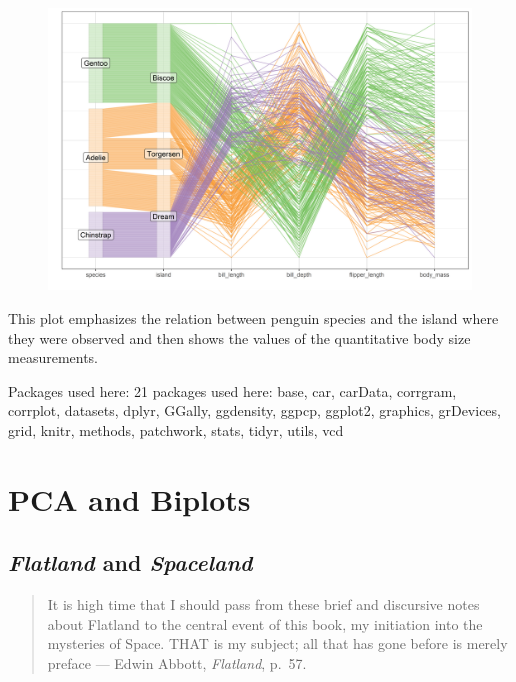 \documentclass[
  letterpaper,
  10pt,
  krantz2]{krantz}
\begin{document}
\begin{figure}

{\centering \includegraphics[width=18in,height=\textheight]{figs/fig-peng-ggpcp2-1.png}

}

\end{figure}

This plot emphasizes the relation between penguin species and the island
where they were observed and then shows the values of the quantitative
body size measurements.

Packages used here: 21 packages used here: base, car, carData, corrgram,
corrplot, datasets, dplyr, GGally, ggdensity, ggpcp, ggplot2, graphics,
grDevices, grid, knitr, methods, patchwork, stats, tidyr, utils, vcd


\hypertarget{sec-pca-biplot}{%
\chapter{PCA and Biplots}\label{sec-pca-biplot}}

\hypertarget{sec-spaceland}{%
\section{\texorpdfstring{\emph{Flatland} and
\emph{Spaceland}}{Flatland and Spaceland}}\label{sec-spaceland}}

\begin{quote}
It is high time that I should pass from these brief and discursive notes
about Flatland to the central event of this book, my initiation into the
mysteries of Space. THAT is my subject; all that has gone before is
merely preface --- Edwin Abbott, \emph{Flatland}, p.~57.
\end{quote}
\end{document}

